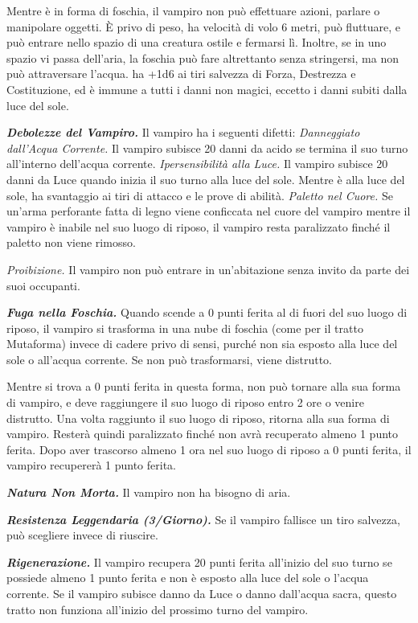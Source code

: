 \begin{multicols}{2}
Mentre è in forma di foschia, il vampiro non può effettuare azioni,
parlare o manipolare oggetti. È privo di peso, ha velocità di volo 6
metri, può fluttuare, e può entrare nello spazio di una creatura ostile
e fermarsi lì. Inoltre, se in uno spazio vi passa dell'aria, la foschia
può fare altrettanto senza stringersi, ma non può attraversare l'acqua.
ha +1d6 ai tiri salvezza di Forza, Destrezza e Costituzione, ed è
immune a tutti i danni non magici, eccetto i danni subiti dalla luce del
sole.

\emph{\textbf{Debolezze del Vampiro.}} Il vampiro ha i seguenti difetti:
\emph{Danneggiato dall'Acqua Corrente.} Il vampiro subisce 20 danni da
acido se termina il suo turno all'interno dell'acqua corrente.
\emph{Ipersensibilità alla Luce.} Il vampiro subisce 20 danni da Luce
quando inizia il suo turno alla luce del sole. Mentre è alla luce del
sole, ha svantaggio ai tiri di attacco e le prove di abilità.
\emph{Paletto nel Cuore.} Se un'arma perforante fatta di legno viene
conficcata nel cuore del vampiro mentre il vampiro è inabile nel suo
luogo di riposo, il vampiro resta paralizzato finché il paletto non
viene rimosso.

\emph{Proibizione.} Il vampiro non può entrare in un'abitazione senza
invito da parte dei suoi occupanti.

\emph{\textbf{Fuga nella Foschia.}} Quando scende a 0 punti ferita al di
fuori del suo luogo di riposo, il vampiro si trasforma in una nube di
foschia (come per il tratto Mutaforma) invece di cadere privo di sensi,
purché non sia esposto alla luce del sole o all'acqua corrente. Se non
può trasformarsi, viene distrutto.

Mentre si trova a 0 punti ferita in questa forma, non può tornare alla
sua forma di vampiro, e deve raggiungere il suo luogo di riposo entro 2
ore o venire distrutto. Una volta raggiunto il suo luogo di riposo,
ritorna alla sua forma di vampiro. Resterà quindi paralizzato finché non
avrà recuperato almeno 1 punto ferita. Dopo aver trascorso almeno 1 ora
nel suo luogo di riposo a 0 punti ferita, il vampiro recupererà 1 punto
ferita.

\emph{\textbf{Natura Non Morta.}} Il vampiro non ha bisogno di aria.

\emph{\textbf{Resistenza Leggendaria (3/Giorno).}} Se il vampiro
fallisce un tiro salvezza, può scegliere invece di riuscire.



\emph{\textbf{Rigenerazione.}} Il vampiro recupera 20 punti ferita
all'inizio del suo turno se possiede almeno 1 punto ferita e non è
esposto alla luce del sole o l'acqua corrente. Se il vampiro subisce
danno da Luce o danno dall'acqua sacra, questo tratto non funziona
all'inizio del prossimo turno del vampiro.


\end{multicols}
